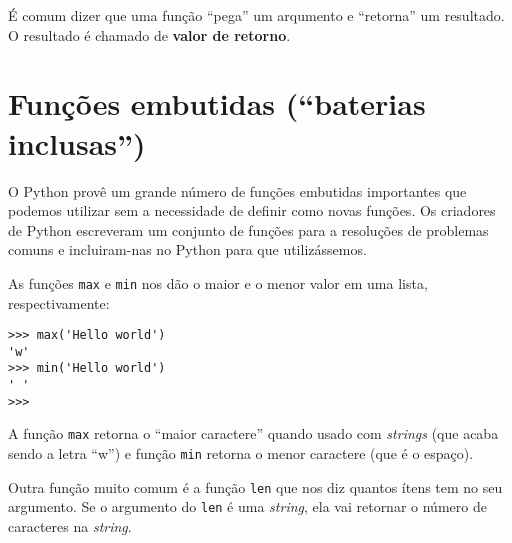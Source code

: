 É comum dizer que uma função ``pega'' um arqumento e ``retorna'' um resultado.
O resultado é chamado de {\bf valor de retorno}.



\section{Funções embutidas (``baterias inclusas'')}

O Python provê um grande número de funções embutidas importantes que podemos
utilizar sem a necessidade de definir como novas funções. Os criadores de
Python escreveram um conjunto de funções para a resoluções de problemas comuns
e incluiram-nas no Python para que utilizássemos.


As funções {\tt max} e {\tt min} nos dão o maior e o menor valor em uma lista,
respectivamente:

\beforeverb
\begin{verbatim}
>>> max('Hello world')
'w'
>>> min('Hello world')
' '
>>>
\end{verbatim}
\afterverb
%
%
A função {\tt max} retorna o ``maior caractere'' quando usado com {\it strings}
(que acaba sendo a letra ``w'') e função {\tt min} retorna o menor caractere
(que é o espaço).


Outra função muito comum é a função {\tt len} que nos diz quantos ítens tem
no seu argumento. Se o argumento do {\tt len} é uma {\it string}, ela vai
retornar o número de caracteres na {\it string}.

